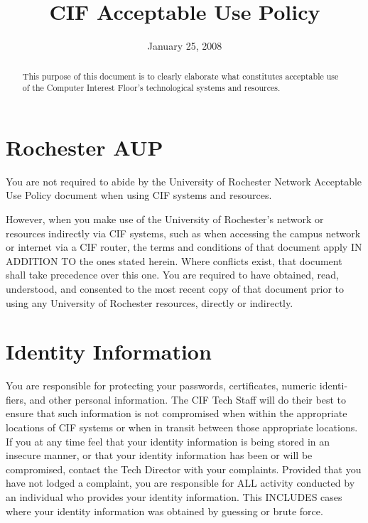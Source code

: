 \documentclass[12pt]{article}
\title{CIF Acceptable Use Policy}
\author{} %
\date{\vspace{-5ex}January 25, 2008} %
\begin{document}
\maketitle

\pagebreak

\begin{abstract}
This purpose of this document is to clearly elaborate what constitutes acceptable use of the Computer Interest Floor's technological systems and resources.
\end{abstract}

\section{Rochester AUP} %

You are not required to abide by the University of Rochester Network Acceptable Use Policy document when using CIF systems and resources.

However, when you make use of the University of Rochester's network or resources indirectly via CIF systems, such as when accessing the campus network or internet via a CIF router, the terms and conditions of that document apply IN ADDITION TO the ones stated herein. Where conflicts exist, that document shall take precedence over this one. You are required to have obtained, read, understood, and consented to the most recent copy of that document prior to using any University of Rochester resources, directly or indirectly.


\section{Identity Information} %

You are responsible for protecting your passwords, certificates, numeric identi- fiers, and other personal information. The CIF Tech Staff will do their best to ensure that such information is not compromised when within the appropriate locations of CIF systems or when in transit between those appropriate locations. If you at any time feel that your identity information is being stored in an insecure manner, or that your identity information has been or will be compromised, contact the Tech Director with your complaints. Provided that you have not lodged a complaint, you are responsible for ALL activity conducted by an individual who provides your identity information. This INCLUDES cases where your identity information was obtained by guessing or brute force.
\end{document}
